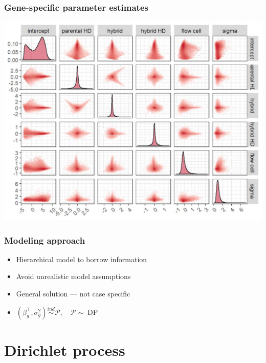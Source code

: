 \documentclass{beamer}
\newcommand{\op}{\operatorname}
\newcommand{\ind}{\stackrel{ind}{\sim}}
\begin{document}
\begin{frame}%
  \frametitle{Gene-specific parameter estimates}
  {\centering
    \includegraphics[width=.8\textwidth]{pairs1}\\
  }
\end{frame}

\begin{frame}%
  \frametitle{Modeling approach}
  \begin{itemize}
           \item Hierarchical model to borrow information
    \pause \item Avoid unrealistic model assumptions
    \pause \item General solution --- not case specific
    \pause \item $(\beta_g^\top,\sigma^2_g) \ind \mathcal{P},\quad \mathcal{P} \sim \op{DP}$
  \end{itemize}
\end{frame}

\section[DP intro]{Dirichlet process}
\end{document}

